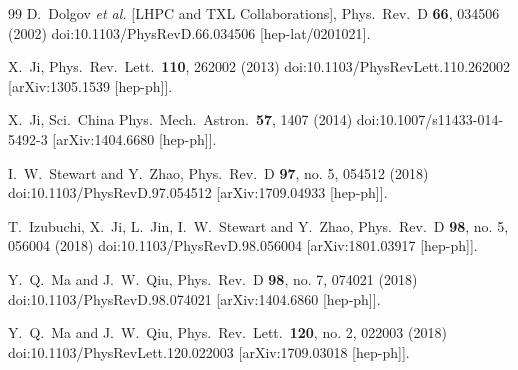 \begin{thebibliography}{99}
  D.~Dolgov {\it et al.} [LHPC and TXL Collaborations],
  Phys.\ Rev.\ D {\bf 66}, 034506 (2002)
  doi:10.1103/PhysRevD.66.034506
  [hep-lat/0201021].


  X.~Ji,
  Phys.\ Rev.\ Lett.\  {\bf 110}, 262002 (2013)
  doi:10.1103/PhysRevLett.110.262002
  [arXiv:1305.1539 [hep-ph]].


  X.~Ji,
  Sci.\ China Phys.\ Mech.\ Astron.\  {\bf 57}, 1407 (2014)
  doi:10.1007/s11433-014-5492-3
  [arXiv:1404.6680 [hep-ph]].


  I.~W.~Stewart and Y.~Zhao,
  Phys.\ Rev.\ D {\bf 97}, no. 5, 054512 (2018)
  doi:10.1103/PhysRevD.97.054512
  [arXiv:1709.04933 [hep-ph]].


  T.~Izubuchi, X.~Ji, L.~Jin, I.~W.~Stewart and Y.~Zhao,
  Phys.\ Rev.\ D {\bf 98}, no. 5, 056004 (2018)
  doi:10.1103/PhysRevD.98.056004
  [arXiv:1801.03917 [hep-ph]].


  Y.~Q.~Ma and J.~W.~Qiu,
  Phys.\ Rev.\ D {\bf 98}, no. 7, 074021 (2018)
  doi:10.1103/PhysRevD.98.074021
  [arXiv:1404.6860 [hep-ph]].


  Y.~Q.~Ma and J.~W.~Qiu,
  Phys.\ Rev.\ Lett.\  {\bf 120}, no. 2, 022003 (2018)
  doi:10.1103/PhysRevLett.120.022003
  [arXiv:1709.03018 [hep-ph]].



\end{thebibliography}
